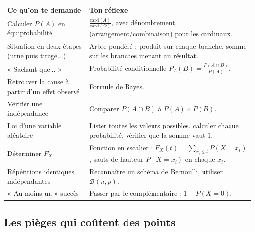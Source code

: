 \documentclass[11pt,a4paper]{article}
\begin{document}
\begin{center}
\renewcommand{\arraystretch}{1.45}
\sffamily\small
\begin{tabular}{>{\raggedright\arraybackslash}p{7.2cm} >{\raggedright\arraybackslash}p{8cm}}
\rowcolor{qtealdark} \color{white}\bfseries Ce qu'on te demande & \color{white}\bfseries Ton réflexe \\
\rowcolor{tealpale} Calculer $P(A)$ en équiprobabilité & $\frac{\text{card}(A)}{\text{card}(\Omega)}$, avec dénombrement (arrangement/combinaison) pour les cardinaux. \\
Situation en deux étapes (urne puis tirage...) & Arbre pondéré : produit sur chaque branche, somme sur les branches menant au résultat. \\
\rowcolor{tealpale} « Sachant que... » & Probabilité conditionnelle $P_A(B)=\frac{P(A\cap B)}{P(A)}$. \\
Retrouver la cause à partir d'un effet observé & Formule de Bayes. \\
\rowcolor{tealpale} Vérifier une indépendance & Comparer $P(A\cap B)$ à $P(A)\times P(B)$. \\
Loi d'une variable aléatoire & Lister toutes les valeurs possibles, calculer chaque probabilité, vérifier que la somme vaut $1$. \\
\rowcolor{tealpale} Déterminer $F_X$ & Fonction en escalier : $F_X(t)=\sum_{x_i\leq t}P(X=x_i)$, sauts de hauteur $P(X=x_i)$ en chaque $x_i$. \\
Répétitions identiques indépendantes & Reconnaître un schéma de Bernoulli, utiliser $\mathcal{B}(n,p)$. \\
\rowcolor{tealpale} « Au moins un » succès & Passer par le complémentaire : $1-P(X=0)$. \\
\end{tabular}
\end{center}

\subsection{Les pièges qui coûtent des points}
\end{document}
